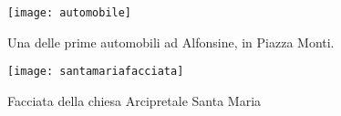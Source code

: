  \begin{figure}[htb]
    \centering
    \vspace{-0.3cm}
    \texttt{[image: automobile]}
    \caption[Automobile in piazza Monti]{Una delle prime automobili ad Alfonsine, in Piazza Monti.\label{fig:automobile}}
    \vspace{-0.7cm}
\end{figure}



 \begin{figure}[htb]
    \centering
    \texttt{[image: santamariafacciata]}
    \caption{Facciata della chiesa Arcipretale Santa Maria\label{fig:santamariafacciata}}
    \vspace{-0.5cm}
\end{figure}





































%